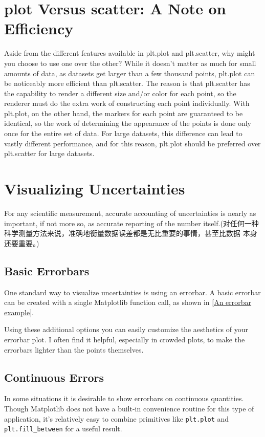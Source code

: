 \section{plot Versus scatter: A Note on Efficiency}
\begin{tcolorbox}
    Aside from the different features available in plt.plot and plt.scatter, why might
    you choose to use one over the other? While it doesn’t matter as much for small
    amounts of data, as datasets get larger than a few thousand points, plt.plot can be
    noticeably more efficient than plt.scatter. The reason is that plt.scatter has the
    capability to render a different size and/or color for each point, so the renderer must
    do the extra work of constructing each point individually. With plt.plot, on the
    other hand, the markers for each point are guaranteed to be identical, so the work of
    determining the appearance of the points is done only once for the entire set of data.
    For large datasets, this difference can lead to vastly different performance, and for
    this reason, plt.plot should be preferred over plt.scatter for large datasets.
\end{tcolorbox}

\section{Visualizing Uncertainties}
For any scientific measurement, accurate accounting of uncertainties is nearly as
important, if not more so, as accurate reporting of the number itself.(对任何一种科学测量方法来说，准确地衡量数据误差都是无比重要的事情，甚至比数据
本身还要重要。)
\subsection*{Basic Errorbars}
One standard way to visualize uncertainties is using an errorbar. A basic errorbar can
be created with a single Matplotlib function call, as shown in \autoref{An errorbar example}.


Using these additional options you can easily customize the aesthetics of your errorbar plot. I often find it helpful, especially in crowded plots, to make
the errorbars lighter than the points themselves.

\subsection*{Continuous Errors}
In some situations it is desirable to show errorbars on continuous quantities. Though
Matplotlib does not have a built-in convenience routine for this type of application,
it’s relatively easy to combine primitives like \verb|plt.plot| and \verb|plt.fill_between| for a
useful result.

